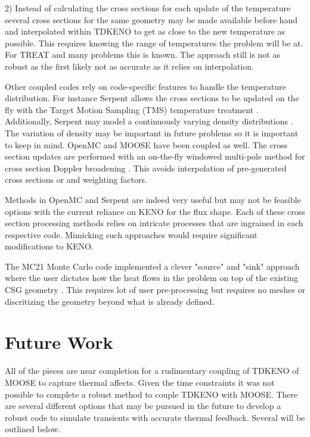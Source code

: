 \documentclass[11pt]{article}
\begin{document}
2)  Instead of calculating the cross sections for each update of the temperature several cross sections for the same geometry may be made available before hand and interpolated within TDKENO to get as close to the new temperature as possible.  This requires knowing the range of temperatures the problem will be at.  For TREAT and many problems this is known.  The approach still is not as robust as the first likely not as accurate as it relies on interpolation.

Other coupled codes rely on code-specific features to handle the temperature distribution.  For instance Serpent allows the cross sections to be updated on the fly with the Target Motion Sampling (TMS) temperature treatment \cite{viitanen2012explicit}. Additionally, Serpent may model a continuously varying density distributions \cite{leppanen2013modeling}.  The variation of density may be important in future problems so it is important to keep in mind.  
OpenMC and MOOSE have been coupled as well.  The cross section updates are performed with an on-the-fly windowed multi-pole method for cross section Doppler broadening \cite{josey2016windowed}. This avoids interpolation of pre-generated cross sections or and weighting factors.  

Methods in OpenMC and Serpent are indeed very useful but may not be feasible options with the current reliance on KENO for the flux shape.  Each of these cross section processing methods relies on intricate processes that are ingrained in each respective code.  Mimicking such approaches would require significant modifications to KENO.  

The MC21 Monte Carlo code implemented a clever "source" and "sink" approach where the user dictates how the heat flows in the problem on top of the existing CSG geometry \cite{griesheimer2008integrated}.  This requires lot of user pre-processing but requires no meshes or discritizing the geometry beyond what is already defined.     



\section{Future Work}
All of the pieces are near  completion for a rudimentary coupling of TDKENO of MOOSE to capture  thermal affects.  Given the time constraints it was not possible to complete a robust method to couple TDKENO with MOOSE.  There are several different options that may be pursued in the future to develop a robust code to simulate transients with accurate thermal feedback. Several will be outlined below. 
\end{document}
